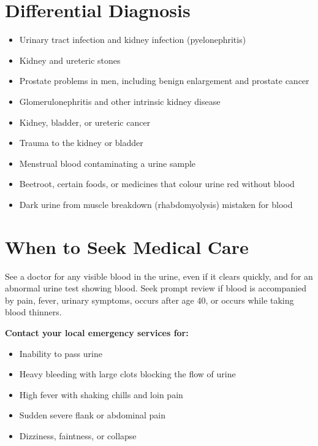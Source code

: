 \section*{Differential Diagnosis}
\begin{itemize}
    \item Urinary tract infection and kidney infection (pyelonephritis)
    \item Kidney and ureteric stones
    \item Prostate problems in men, including benign enlargement and prostate cancer
    \item Glomerulonephritis and other intrinsic kidney disease
    \item Kidney, bladder, or ureteric cancer
    \item Trauma to the kidney or bladder
    \item Menstrual blood contaminating a urine sample
    \item Beetroot, certain foods, or medicines that colour urine red without blood
    \item Dark urine from muscle breakdown (rhabdomyolysis) mistaken for blood
\end{itemize}

\section*{When to Seek Medical Care}
See a doctor for any visible blood in the urine, even if it clears quickly, and for an abnormal urine test showing blood. Seek prompt review if blood is accompanied by pain, fever, urinary symptoms, occurs after age 40, or occurs while taking blood thinners.

\textbf{Contact your local emergency services for:}
\begin{itemize}
    \item Inability to pass urine
    \item Heavy bleeding with large clots blocking the flow of urine
    \item High fever with shaking chills and loin pain
    \item Sudden severe flank or abdominal pain
    \item Dizziness, faintness, or collapse
\end{itemize}

